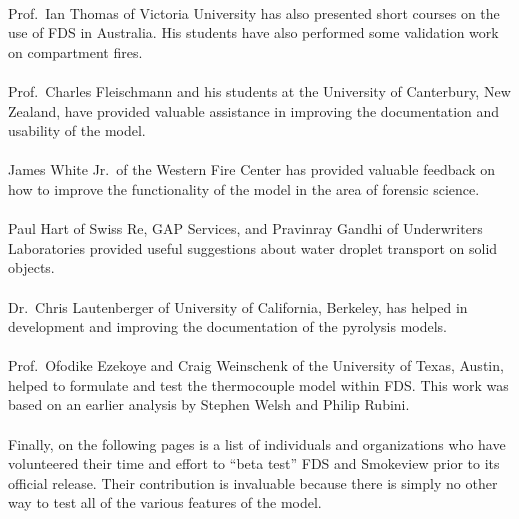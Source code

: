 \documentclass[11pt]{book}
\begin{document}
\\
\noindent Prof.~Ian Thomas of Victoria University has also presented short courses on the use of FDS in Australia.
His students have also performed some validation work on compartment fires.\\
\\
\noindent Prof.~Charles Fleischmann and his students at the University of Canterbury, New Zealand, have provided valuable assistance
in improving the documentation and usability of the model.\\
\\
\noindent James White Jr.~of the Western Fire Center has provided valuable feedback on how to
improve the functionality of the model in the area of forensic science.\\
\\
\noindent Paul Hart of Swiss Re, GAP Services, and Pravinray Gandhi of Underwriters Laboratories provided useful suggestions about
water droplet transport on solid objects.\\
\\
\noindent Dr.~Chris Lautenberger of University of California, Berkeley, has helped in development and improving the documentation of the pyrolysis models.\\
\\
\noindent Prof.~Ofodike Ezekoye and Craig Weinschenk of the University of Texas, Austin, helped to formulate and test the thermocouple model within FDS. This work was based on an earlier analysis by Stephen Welsh and Philip Rubini.\\
\\
\noindent Finally, on the following pages is a list of individuals and organizations who have volunteered their time and effort to
``beta test'' FDS and Smokeview prior to its official release. Their contribution is invaluable because there is simply no other way
to test all of the various features of the model.

\newpage
\end{document}
